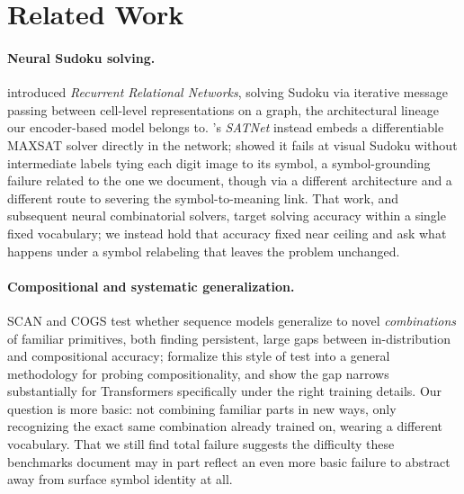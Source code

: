 \documentclass{article} %
\begin{document}
\section{Related Work}
\label{sec:related}

\paragraph{Neural Sudoku solving.} \citet{palm2018recurrent} introduced
\emph{Recurrent Relational Networks}, solving Sudoku via iterative
message passing between cell-level representations on a graph, the
architectural lineage our encoder-based model belongs to.
\citet{wang2019satnet}'s \emph{SATNet} instead embeds a differentiable
MAXSAT solver directly in the network; \citet{chang2020assessing} showed
it fails at visual Sudoku without intermediate labels tying each digit
image to its symbol, a symbol-grounding failure related to the one we
document, though via a different architecture and a different route to
severing the symbol-to-meaning link. That work, and
subsequent neural combinatorial solvers, target solving accuracy within a
single fixed vocabulary; we instead hold that accuracy fixed near ceiling
and ask what happens under a symbol relabeling that leaves the problem
unchanged.

\paragraph{Compositional and systematic generalization.} SCAN
\citep{lake2018generalization} and COGS \citep{kim2020cogs} test whether
sequence models generalize to novel \emph{combinations} of familiar
primitives, both finding persistent, large gaps between in-distribution
and compositional accuracy; \citet{hupkes2020compositionality} formalize
this style of test into a general methodology for probing
compositionality, and \citet{csordas2021devil} show the gap narrows
substantially for Transformers specifically under the right training
details. Our question is more basic: not combining familiar parts in new
ways, only recognizing the exact same combination already trained on,
wearing a different vocabulary. That we still find total failure
suggests the difficulty these benchmarks document may in part reflect an
even more basic failure to abstract away from surface symbol identity at
all.
\end{document}
